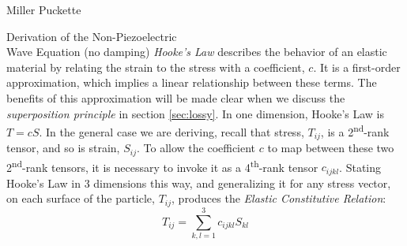 \documentclass[a4paper,10pt]{report}
\numberwithin{equation}{section}
\begin{document}
\begin{chapter}{Miller Puckette}
\begin{section}{Derivation of the Non-Piezoelectric \\ Wave Equation (no damping)}
\emph{Hooke's Law} describes the behavior of an elastic material by relating the strain
to the stress with a coefficient, $c$. It is a first-order approximation, which implies a linear relationship between these terms. The benefits of this approximation will be made clear when we discuss the \emph{superposition principle} in section \ref{sec:lossy}. In one dimension, Hooke's Law is $T = cS$. In the general case we are deriving, recall that stress, $T_{ij}$, is a 2\textsuperscript{nd}-rank tensor, and so is strain, $S_{ij}$. To allow the coefficient $c$ to map between these two 2\textsuperscript{nd}-rank tensors, it is necessary to invoke it as a 4\textsuperscript{th}-rank tensor $c_{ijkl}$. Stating Hooke's Law in 3 dimensions this way, and generalizing it for any stress vector, on each surface of the particle, $T_{ij}$, produces the \emph{Elastic Constitutive Relation}\cite[p.~542]{Kino1987}:
\begin{equation}\label{ecrelation}
 T_{ij} = \sum_{k,l=1}^3 c_{ijkl} S_{kl}
\end{equation}


\end{section}
\end{chapter}
\end{document}
